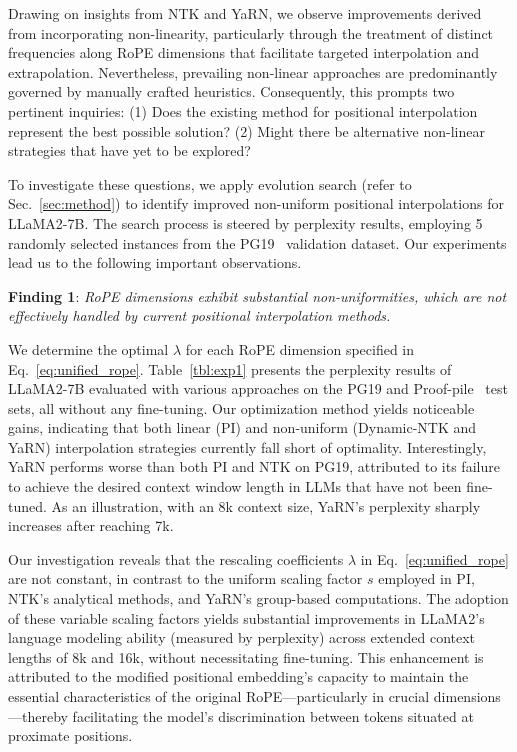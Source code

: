 Drawing on insights from NTK and YaRN, we observe improvements derived from incorporating non-linearity, particularly through the treatment of distinct frequencies along RoPE dimensions that facilitate targeted interpolation and extrapolation. Nevertheless, prevailing non-linear approaches are predominantly governed by manually crafted heuristics. Consequently, this prompts two pertinent inquiries: (1) Does the existing method for positional interpolation represent the best possible solution? (2) Might there be alternative non-linear strategies that have yet to be explored?

To investigate these questions, we apply evolution search (refer to Sec.~\ref{sec:method}) to identify improved non-uniform positional interpolations for LLaMA2-7B. The search process is steered by perplexity results, employing 5 randomly selected instances from the PG19~\cite{pg19} validation dataset. Our experiments lead us to the following important observations.

\textbf{Finding 1}: \textit{RoPE dimensions exhibit substantial non-uniformities, which are not effectively handled by current positional interpolation methods.}

We determine the optimal $\lambda$ for each RoPE dimension specified in Eq.~\ref{eq:unified_rope}. Table~\ref{tbl:exp1} presents the perplexity results of LLaMA2-7B evaluated with various approaches on the PG19 and Proof-pile~\cite{proof-pile} test sets, all without any fine-tuning. Our optimization method yields noticeable gains, indicating that both linear (PI) and non-uniform (Dynamic-NTK and YaRN) interpolation strategies currently fall short of optimality. Interestingly, YaRN performs worse than both PI and NTK on PG19, attributed to its failure to achieve the desired context window length in LLMs that have not been fine-tuned. As an illustration, with an 8k context size, YaRN’s perplexity sharply increases after reaching 7k.

Our investigation reveals that the rescaling coefficients $\lambda$ in Eq.~\ref{eq:unified_rope} are not constant, in contrast to the uniform scaling factor $s$ employed in PI, NTK’s analytical methods, and YaRN’s group-based computations. The adoption of these variable scaling factors yields substantial improvements in LLaMA2’s language modeling ability (measured by perplexity) across extended context lengths of 8k and 16k, without necessitating fine-tuning. This enhancement is attributed to the modified positional embedding’s capacity to maintain the essential characteristics of the original RoPE—particularly in crucial dimensions—thereby facilitating the model’s discrimination between tokens situated at proximate positions.

